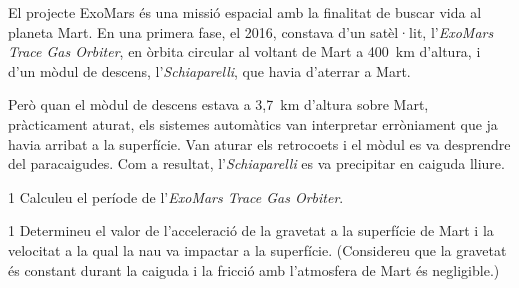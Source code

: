 El projecte ExoMars és una missió espacial amb la finalitat de buscar vida al planeta Mart. En una primera fase, el 2016, constava d'un satèl·lit, l'\textit{ExoMars Trace Gas Orbiter}, en òrbita circular al voltant de Mart a 400~km d'altura, i d'un mòdul de descens, l'\textit{Schiaparelli}, que havia d'aterrar a Mart.

Però quan el mòdul de descens estava a 3,7~km d'altura sobre Mart, pràcticament aturat, els sistemes automàtics van interpretar erròniament que ja havia arribat a la superfície. Van aturar els retrocoets i el mòdul es va desprendre del paracaigudes. Com a resultat, l'\textit{Schiaparelli} es va precipitar en caiguda lliure.


\begin{apartat}{1}
Calculeu el període de l'\textit{ExoMars Trace Gas Orbiter}.
\end{apartat}

\begin{apartat}{1}
Determineu el valor de l'acceleració de la gravetat a la superfície de Mart i la velocitat a la qual la nau va impactar a la superfície. (Considereu que la gravetat és constant durant la caiguda i la fricció amb l'atmosfera de Mart és negligible.)
\end{apartat}


